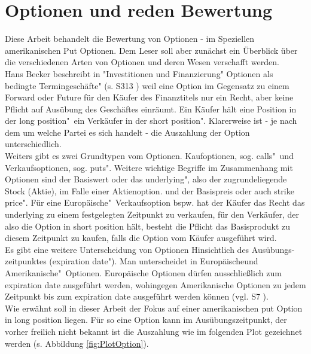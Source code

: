 \documentclass[10pt,a4paper]{report}\usepackage[]{graphicx}\usepackage[]{color}
\begin{document}
\section{Optionen und reden Bewertung}
Diese Arbeit behandelt die Bewertung von Optionen - im Speziellen amerikanischen Put Optionen.
Dem Leser soll aber zunächst ein Überblick über die verschiedenen Arten von Optionen und deren Wesen verschafft werden.\\
Hans Becker beschreibt in "Investitionen und Finanzierung" Optionen als \glqq bedingte Termingeschäfte" (s. S313 \cite{Becker2012}) weil eine Option im Gegensatz zu einem Forward oder Future für den Käufer des Finanztitels nur ein Recht, aber keine Pflicht auf Ausübung des Geschäftes einräumt. Ein Käufer hält eine Position in der \glqq long position"\ ein Verkäufer in der \glqq short position". Klarerweise ist - je nach dem um welche Partei es sich handelt -  die Auszahlung der Option unterschiedlich.\\
Weiters gibt es zwei Grundtypen vom Optionen. Kaufoptionen, sog. \glqq calls"\ und Verkaufsoptionen, sog. \glqq puts". Weitere wichtige Begriffe im Zusammenhang mit Optionen sind der Basiswert oder das \glqq underlying", also der zugrundeliegende Stock (Aktie), im Falle einer Aktienoption. und der Basispreis oder auch \glqq strike price". Für eine \glqq Europäische"\ Verkaufsoption bspw. hat der Käufer das Recht das underlying zu 
einem festgelegten Zeitpunkt zu verkaufen, für den Verkäufer, der also die Option in short position hält, besteht die Pflicht das Basisprodukt zu diesem Zeitpunkt zu kaufen, falls die Option vom Käufer ausgeführt wird.\\
Es gibt eine weitere Unterscheidung von Optionen Hinsichtlich des Ausübungs-zeitpunktes (\glqq expiration date"). Man unterscheidet in \glqq Europäische\grqq und \glqq Amerikanische"\ Optionen. Europäische Optionen dürfen ausschließlich zum expiration date ausgeführt werden, wohingegen Amerikanische Optionen zu jedem Zeitpunkt bis zum expiration date ausgeführt werden können (vgl. S7 \cite{Hull}).\\
Wie erwähnt soll in dieser Arbeit der Fokus auf einer amerikanischen put Option in long position liegen. Für so eine Option kann im Ausübungszeitpunkt, der vorher freilich nicht bekannt ist die Auszahlung wie im folgenden Plot gezeichnet werden (s. Abbildung \ref{fig:PlotOption}).
\end{document}
